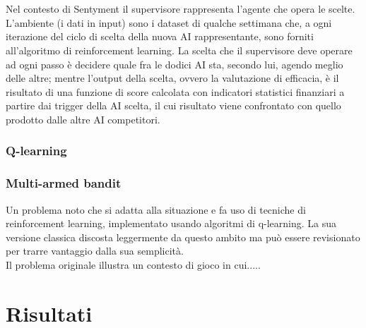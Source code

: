 \documentclass[a4paper,12pt]{report}
\begin{document}
\\~\\Nel contesto di Sentyment il supervisore rappresenta l'agente che opera le scelte. L'ambiente (i dati in input) sono i dataset di qualche settimana che, a ogni iterazione del ciclo di scelta della nuova AI rappresentante, sono forniti all'algoritmo di reinforcement learning. La scelta che il supervisore deve operare ad ogni passo è decidere quale fra le dodici AI sta, secondo lui, agendo meglio delle altre; mentre l'output della scelta, ovvero la valutazione di efficacia, è il risultato di una funzione di score calcolata con indicatori statistici finanziari a partire dai trigger della AI scelta, il cui risultato viene confrontato con quello prodotto dalle altre AI competitori.

\subsection{Q-learning}


\subsection{Multi-armed bandit}
Un problema noto che si adatta alla situazione e fa uso di tecniche di reinforcement learning, implementato usando algoritmi di q-learning. La sua versione classica discosta leggermente da questo ambito ma può essere revisionato per trarre vantaggio dalla sua semplicità.\cite{rl}\\
Il problema originale illustra un contesto di gioco in cui.....

\newpage
\chapter{Risultati}
\label{cap5}

\newpage
\end{document}
